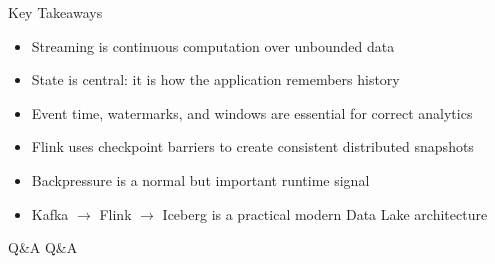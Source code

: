 \documentclass[aspectratio=169]{beamer}
\begin{document}
\begin{frame}{Key Takeaways}
\begin{itemize}
    \item Streaming is continuous computation over unbounded data
    \item State is central: it is how the application remembers history
    \item Event time, watermarks, and windows are essential for correct analytics
    \item Flink uses checkpoint barriers to create consistent distributed snapshots
    \item Backpressure is a normal but important runtime signal
    \item Kafka $\rightarrow$ Flink $\rightarrow$ Iceberg is a practical modern Data Lake architecture
\end{itemize}
\end{frame}


\begin{frame}{Q\&A}
\centering
\Large Q\&A
\vspace{0.4cm}

\end{frame}
\end{document}
